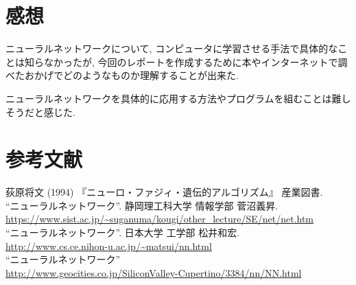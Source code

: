 \documentclass[10pt]{jsarticle}
\begin{document}
\section{感想}
	ニューラルネットワークについて, コンピュータに学習させる手法で具体的なことは知らなかったが, 今回のレポートを作成するために本やインターネットで調べたおかげでどのようなものか理解することが出来た. \par ニューラルネットワークを具体的に応用する方法やプログラムを組むことは難しそうだと感じた.
	
\section{参考文献}
\noindent
	荻原将文 (1994) 『ニューロ・ファジィ・遺伝的アルゴリズム』 産業図書. \\
	
	``ニューラルネットワーク''. 静岡理工科大学 情報学部 菅沼義昇.\\
	\url{https://www.sist.ac.jp/~suganuma/kougi/other_lecture/SE/net/net.htm} \\
	
	``ニューラルネットワーク''. 日本大学 工学部 松井和宏.\\
	\url{http://www.cs.ce.nihon-u.ac.jp/~matsui/nn.html} \\
	
	``ニューラルネットワーク'' \\
	\url{http://www.geocities.co.jp/SiliconValley-Cupertino/3384/nn/NN.html}
\end{document}

